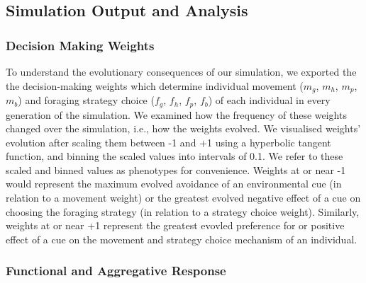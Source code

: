 \documentclass[11pt]{article}
\begin{document}
\subsection{Simulation Output and Analysis}

\subsubsection{Decision Making Weights}

To understand the evolutionary consequences of our simulation, we exported the the decision-making weights which determine individual movement ($m_g$, $m_h$, $m_p$, $m_b$) and foraging strategy choice ($f_g$, $f_h$, $f_p$, $f_b$) of each individual in every generation of the simulation.
We examined how the frequency of these weights changed over the simulation, i.e., how the weights evolved.
We visualised weights' evolution after scaling them between -1 and +1 using a hyperbolic tangent function, and binning the scaled values into intervals of 0.1.
We refer to these scaled and binned values as phenotypes for convenience.
Weights at or near -1 would represent the maximum evolved avoidance of an environmental cue (in relation to a movement weight) or the greatest evolved negative effect of a cue on choosing the foraging strategy (in relation to a strategy choice weight).
Similarly, weights at or near +1 represent the greatest evovled preference for or positive effect of a cue on the movement and strategy choice mechanism of an individual.

\subsubsection{Functional and Aggregative Response}
\end{document}
